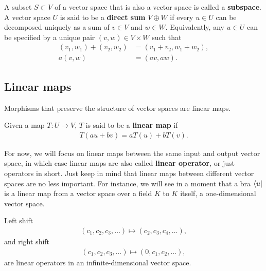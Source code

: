 A subset $S \subset V$ of a vector space that is also a vector space is called a {\bf subspace}.
A vector space $U$ is said to be a {\bf direct sum} $V\oplus W$ if every $u\in U$ can be decomposed uniquely as a sum of $v\in V$ and $w\in W$.
Equivalently, any $u\in U$ can be specified by a unique pair $(v,w)\in V\times W$ such that
\begin{align}
	(v_1,w_1) + (v_2,w_2) &= (v_1+v_2,w_1+w_2), \label{direct-sum-add}\\
	a(v,w) &= (av,aw). \label{direct-sum-scalar}
\end{align}


\subsection{Linear maps}

Morphisms that preserve the structure of vector spaces are linear maps.
\begin{definition}
	Given a map $T:U\to V$,
	$T$ is said to be a {\bf linear map} if
	\begin{align}
		T(au + bv) = aT(u) + bT(v).
	\end{align}
\end{definition}

\noindent For now, we will focus on linear maps between the same input and output vector space, in which case linear maps are also called {\bf linear operator}, or just operators in short. Just keep in mind that linear maps between different vector spaces are no less important. For instance, we will see in a moment that a bra $\bra{u}$ is a linear map from a vector space over a field $K$ to $K$ itself, a one-dimensional vector space. 

\begin{example}
	Left shift
	\begin{align}
		(c_1,c_2,c_3,\dots) \mapsto (c_2,c_3,c_4,\dots),\label{eq:left-shift}
	\end{align}
	and right shift
	\begin{align}
		(c_1,c_2,c_3,\dots) \mapsto (0,c_1,c_2,\dots),\label{eq:right-shift}
	\end{align}
	are linear operators in an infinite-dimensional vector space.
\end{example}

